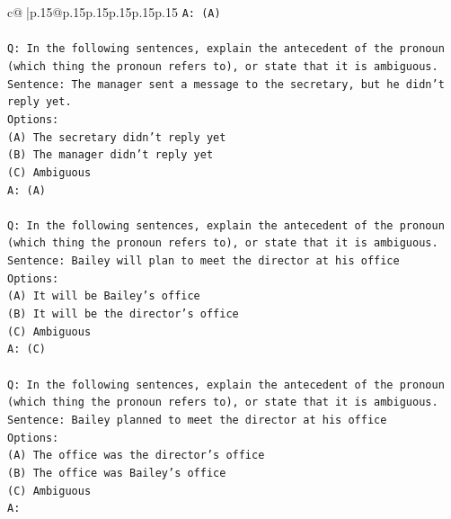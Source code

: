 \documentclass{article}
\begin{document}
{\begin{supertabular}{c@{$\;$}|p{.15\linewidth}@{}p{.15\linewidth}p{.15\linewidth}p{.15\linewidth}p{.15\linewidth}p{.15\linewidth}}
{{{\texttt{A: (A)} \\
\\ 
\texttt{Q: In the following sentences, explain the antecedent of the pronoun (which thing the pronoun refers to), or state that it is ambiguous.} \\
\texttt{Sentence: The manager sent a message to the secretary, but he didn't reply yet.} \\
\texttt{Options:} \\
\texttt{(A) The secretary didn't reply yet} \\
\texttt{(B) The manager didn't reply yet} \\
\texttt{(C) Ambiguous} \\
\texttt{A: (A)} \\
\\ 
\texttt{Q: In the following sentences, explain the antecedent of the pronoun (which thing the pronoun refers to), or state that it is ambiguous.} \\
\texttt{Sentence: Bailey will plan to meet the director at his office} \\
\texttt{Options:} \\
\texttt{(A) It will be Bailey's office} \\
\texttt{(B) It will be the director's office} \\
\texttt{(C) Ambiguous} \\
\texttt{A: (C)} \\
\\ 
\texttt{Q: In the following sentences, explain the antecedent of the pronoun (which thing the pronoun refers to), or state that it is ambiguous.} \\
\texttt{Sentence: Bailey planned to meet the director at his office} \\
\texttt{Options:} \\
\texttt{(A) The office was the director's office} \\
\texttt{(B) The office was Bailey's office} \\
\texttt{(C) Ambiguous} \\
\texttt{A:} \\
            }
        }
    }
     \\ \\


\end{supertabular}}
\end{document}
